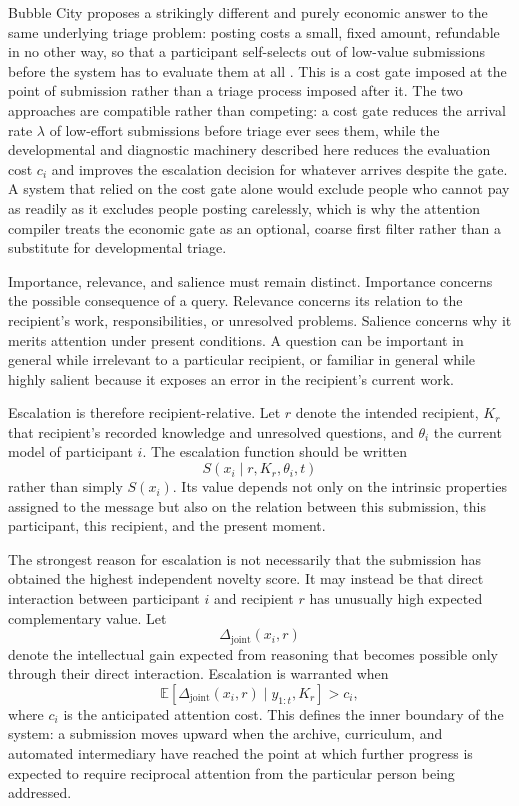 \documentclass[11pt]{article}
\begin{document}
Bubble City proposes a strikingly different and purely economic answer to the same underlying triage problem: posting costs a small, fixed amount, refundable in no other way, so that a participant self-selects out of low-value submissions before the system has to evaluate them at all \cite{anderson2022bubblecity}. This is a cost gate imposed at the point of submission rather than a triage process imposed after it. The two approaches are compatible rather than competing: a cost gate reduces the arrival rate $\lambda$ of low-effort submissions before triage ever sees them, while the developmental and diagnostic machinery described here reduces the evaluation cost $c_i$ and improves the escalation decision for whatever arrives despite the gate. A system that relied on the cost gate alone would exclude people who cannot pay as readily as it excludes people posting carelessly, which is why the attention compiler treats the economic gate as an optional, coarse first filter rather than a substitute for developmental triage.

Importance, relevance, and salience must remain distinct. Importance concerns the possible consequence of a query. Relevance concerns its relation to the recipient's work, responsibilities, or unresolved problems. Salience concerns why it merits attention under present conditions. A question can be important in general while irrelevant to a particular recipient, or familiar in general while highly salient because it exposes an error in the recipient's current work.

Escalation is therefore recipient-relative. Let $r$ denote the intended recipient, $K_r$ that recipient's recorded knowledge and unresolved questions, and $\theta_i$ the current model of participant $i$. The escalation function should be written
\[
S(x_i \mid r,K_r,\theta_i,t)
\]
rather than simply $S(x_i)$. Its value depends not only on the intrinsic properties assigned to the message but also on the relation between this submission, this participant, this recipient, and the present moment.

The strongest reason for escalation is not necessarily that the submission has obtained the highest independent novelty score. It may instead be that direct interaction between participant $i$ and recipient $r$ has unusually high expected complementary value. Let
\[
\Delta_{\mathrm{joint}}(x_i,r)
\]
denote the intellectual gain expected from reasoning that becomes possible only through their direct interaction. Escalation is warranted when
\[
\mathbb{E}\!\left[
\Delta_{\mathrm{joint}}(x_i,r)
\mid y_{1:t},K_r
\right]
>
c_i,
\]
where $c_i$ is the anticipated attention cost. This defines the inner boundary of the system: a submission moves upward when the archive, curriculum, and automated intermediary have reached the point at which further progress is expected to require reciprocal attention from the particular person being addressed.
\end{document}
